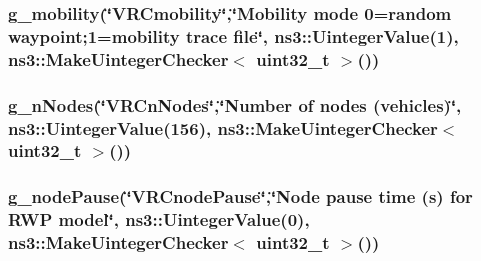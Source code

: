\subsubsection[{\texorpdfstring{g\+\_\+mobility}{g_mobility}}]{ g\+\_\+mobility(\char`\"{}V\+R\+Cmobility\char`\"{},\char`\"{}Mobility mode 0=random waypoint;1=mobility trace file\char`\"{}, ns3\+::\+Uinteger\+Value(1), {\bf ns3\+::\+Make\+Uinteger\+Checker}$<$ uint32\+\_\+t $>$())\hspace{0.3cm}{\ttfamily [static]}}\hypertarget{vanet-routing-compare_8cc_a21858fbf533039d45630ff460f711898}{}\label{vanet-routing-compare_8cc_a21858fbf533039d45630ff460f711898}
\subsubsection[{\texorpdfstring{g\+\_\+n\+Nodes}{g_nNodes}}]{ g\+\_\+n\+Nodes(\char`\"{}V\+R\+Cn\+Nodes\char`\"{},\char`\"{}Number of {\bf nodes} (vehicles)\char`\"{}, ns3\+::\+Uinteger\+Value(156), {\bf ns3\+::\+Make\+Uinteger\+Checker}$<$ uint32\+\_\+t $>$())\hspace{0.3cm}{\ttfamily [static]}}\hypertarget{vanet-routing-compare_8cc_a7432e7fa342e3ef6bb5db75753b31a3c}{}\label{vanet-routing-compare_8cc_a7432e7fa342e3ef6bb5db75753b31a3c}
\subsubsection[{\texorpdfstring{g\+\_\+node\+Pause}{g_nodePause}}]{ g\+\_\+node\+Pause(\char`\"{}V\+R\+Cnode\+Pause\char`\"{},\char`\"{}{\bf Node} pause time ({\bf s}) for R\+WP model\char`\"{}, ns3\+::\+Uinteger\+Value(0), {\bf ns3\+::\+Make\+Uinteger\+Checker}$<$ uint32\+\_\+t $>$())\hspace{0.3cm}{\ttfamily [static]}}\hypertarget{vanet-routing-compare_8cc_a44d88d3789417186134acfb624617e2f}{}\label{vanet-routing-compare_8cc_a44d88d3789417186134acfb624617e2f}
